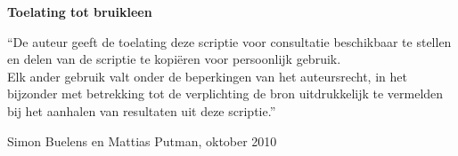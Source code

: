 






\noindent \textbf{\huge Toelating tot bruikleen}

\vspace{1.5cm}

\noindent
``De auteur geeft de toelating deze scriptie voor consultatie beschikbaar
te stellen en delen van de scriptie te kopi\"eren voor persoonlijk
gebruik.\\
Elk ander gebruik valt onder de beperkingen van het auteursrecht,
in het bijzonder met betrekking tot de verplichting de bron uitdrukkelijk
te vermelden bij het aanhalen van resultaten uit deze scriptie.''

\addvspace{4cm}

\noindent Simon Buelens en Mattias Putman, oktober 2010
